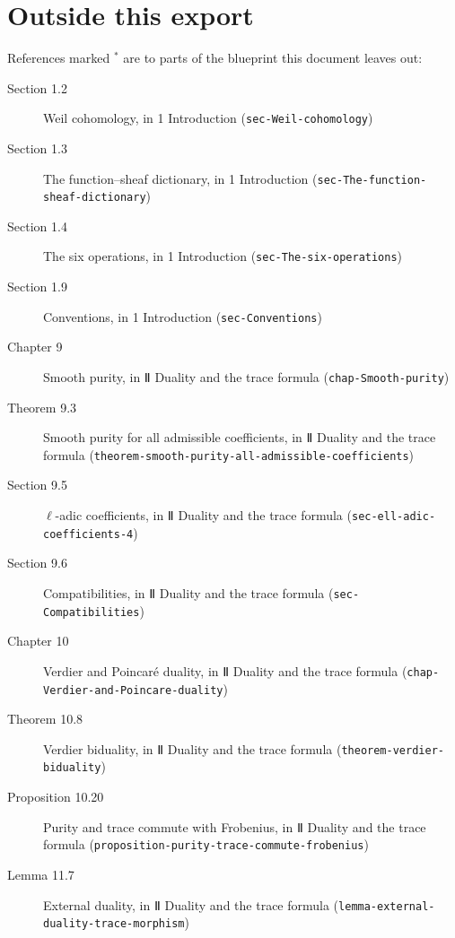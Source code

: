 \documentclass[11pt]{article}
\newcommand{\bpslug}[1]{\texttt{#1}}
\begin{document}
\section*{Outside this export}
References marked \ensuremath{{}^\ast} are to parts of the blueprint this document leaves out:
\begin{description}
\item[Section 1.2] Weil cohomology, in 1 Introduction (\bpslug{sec-{}\allowbreak{}Weil-{}\allowbreak{}cohomology})
\item[Section 1.3] The function–sheaf dictionary, in 1 Introduction (\bpslug{sec-{}\allowbreak{}The-{}\allowbreak{}function-{}\allowbreak{}sheaf-{}\allowbreak{}dictionary})
\item[Section 1.4] The six operations, in 1 Introduction (\bpslug{sec-{}\allowbreak{}The-{}\allowbreak{}six-{}\allowbreak{}operations})
\item[Section 1.9] Conventions, in 1 Introduction (\bpslug{sec-{}\allowbreak{}Conventions})
\item[Chapter 9] Smooth purity, in Ⅱ Duality and the trace formula (\bpslug{chap-{}\allowbreak{}Smooth-{}\allowbreak{}purity})
\item[Theorem 9.3] Smooth purity for all admissible coefficients, in Ⅱ Duality and the trace formula (\bpslug{theorem-{}\allowbreak{}smooth-{}\allowbreak{}purity-{}\allowbreak{}all-{}\allowbreak{}admissible-{}\allowbreak{}coefficients})
\item[Section 9.5] $\ell$-adic coefficients, in Ⅱ Duality and the trace formula (\bpslug{sec-{}\allowbreak{}ell-{}\allowbreak{}adic-{}\allowbreak{}coefficients-{}\allowbreak{}4})
\item[Section 9.6] Compatibilities, in Ⅱ Duality and the trace formula (\bpslug{sec-{}\allowbreak{}Compatibilities})
\item[Chapter 10] Verdier and Poincaré duality, in Ⅱ Duality and the trace formula (\bpslug{chap-{}\allowbreak{}Verdier-{}\allowbreak{}and-{}\allowbreak{}Poincare-{}\allowbreak{}duality})
\item[Theorem 10.8] Verdier biduality, in Ⅱ Duality and the trace formula (\bpslug{theorem-{}\allowbreak{}verdier-{}\allowbreak{}biduality})
\item[Proposition 10.20] Purity and trace commute with Frobenius, in Ⅱ Duality and the trace formula (\bpslug{proposition-{}\allowbreak{}purity-{}\allowbreak{}trace-{}\allowbreak{}commute-{}\allowbreak{}frobenius})
\item[Lemma 11.7] External duality, in Ⅱ Duality and the trace formula (\bpslug{lemma-{}\allowbreak{}external-{}\allowbreak{}duality-{}\allowbreak{}trace-{}\allowbreak{}morphism})

\end{description}
\end{document}
